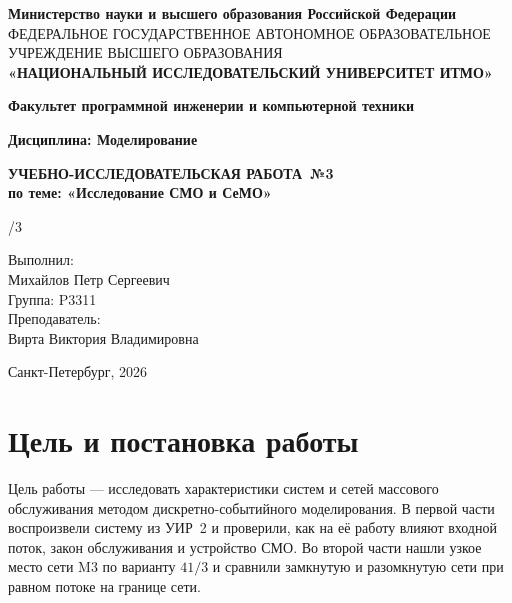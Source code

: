\documentclass[a4paper,12pt]{article}
\newcommand{\LabSubject}{Моделирование}
\newcommand{\LabWorkType}{УЧЕБНО-ИССЛЕДОВАТЕЛЬСКАЯ РАБОТА}
\newcommand{\LabNumber}{3}
\newcommand{\LabTopic}{Исследование СМО и СеМО}
\newcommand{\LabVariant}{41/3} %
\newcommand{\LabAuthor}{Михайлов Петр Сергеевич}
\newcommand{\LabGroup}{P3311}
\newcommand{\LabTeacher}{Вирта Виктория Владимировна}
\newcommand{\LabYear}{2026}
\begin{document}
\begin{titlepage}
\centering
{\fontsize{11}{13}\selectfont\textbf{Министерство науки и высшего образования Российской Федерации}}\\
{\fontsize{7}{10}\selectfont ФЕДЕРАЛЬНОЕ ГОСУДАРСТВЕННОЕ АВТОНОМНОЕ ОБРАЗОВАТЕЛЬНОЕ УЧРЕЖДЕНИЕ ВЫСШЕГО ОБРАЗОВАНИЯ}\\
\vspace{.2cm}
{\fontsize{14}{17}\selectfont\textbf{«НАЦИОНАЛЬНЫЙ ИССЛЕДОВАТЕЛЬСКИЙ УНИВЕРСИТЕТ ИТМО»}}
\vspace{1cm}

{\fontsize{12}{14}\selectfont\textbf{Факультет программной инженерии и компьютерной техники}}
\vspace{1cm}

{\fontsize{12}{14}\selectfont\textbf{Дисциплина: \LabSubject}}
\vspace*{\fill}

{\fontsize{18}{22}\selectfont\textbf{\LabWorkType\ №\LabNumber}}\\
\vspace{.5cm}
{\fontsize{14}{17}\selectfont\textbf{по теме: «\LabTopic»}}
\vspace{1.5cm}

\ifx\LabVariant\empty\else{\fontsize{12}{14}\selectfont\textbf{Вариант: \LabVariant}}\fi
\vspace{1.5cm}
\begin{flushright}
\fontsize{12}{14}\selectfont
Выполнил:\\
\LabAuthor\\
Группа: \LabGroup\\[1em]
Преподаватель:\\
\LabTeacher
\end{flushright}
\vfill
{\fontsize{12}{14}\selectfont Санкт-Петербург, \LabYear}
\end{titlepage}
\setcounter{page}{2}
{\small\setlength{\parskip}{0pt}\tableofcontents}
\newpage

\section{Цель и постановка работы}

Цель работы — исследовать характеристики систем и сетей массового
обслуживания методом дискретно-событийного моделирования.
В первой части воспроизвели систему из УИР~2 и проверили, как на её
работу влияют входной поток, закон обслуживания и устройство СМО.
Во второй части нашли узкое место сети M3 по варианту \(41/3\)
и сравнили замкнутую и разомкнутую сети при равном потоке
на границе сети.
\end{document}
